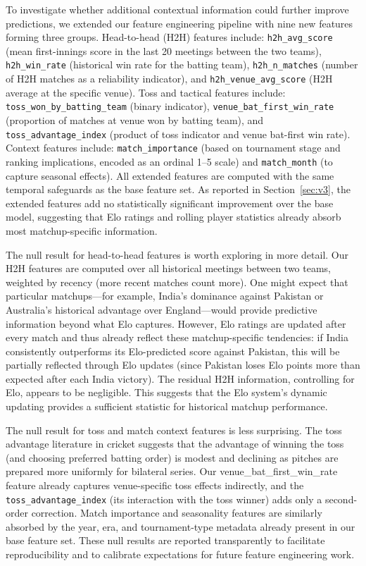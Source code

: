 \documentclass[10pt,a4paper,twocolumn]{article}
\begin{document}
To investigate whether additional contextual information could further improve predictions, we extended our feature engineering pipeline with nine new features forming three groups. Head-to-head (H2H) features include: \texttt{h2h\_avg\_score} (mean first-innings score in the last 20 meetings between the two teams), \texttt{h2h\_win\_rate} (historical win rate for the batting team), \texttt{h2h\_n\_matches} (number of H2H matches as a reliability indicator), and \texttt{h2h\_venue\_avg\_score} (H2H average at the specific venue). Toss and tactical features include: \texttt{toss\_won\_by\_batting\_team} (binary indicator), \texttt{venue\_bat\_first\_win\_rate} (proportion of matches at venue won by batting team), and \texttt{toss\_advantage\_index} (product of toss indicator and venue bat-first win rate). Context features include: \texttt{match\_importance} (based on tournament stage and ranking implications, encoded as an ordinal 1--5 scale) and \texttt{match\_month} (to capture seasonal effects). All extended features are computed with the same temporal safeguards as the base feature set. As reported in Section~\ref{sec:v3}, the extended features add no statistically significant improvement over the base model, suggesting that Elo ratings and rolling player statistics already absorb most matchup-specific information.

The null result for head-to-head features is worth exploring in more detail. Our H2H features are computed over all historical meetings between two teams, weighted by recency (more recent matches count more). One might expect that particular matchups---for example, India's dominance against Pakistan or Australia's historical advantage over England---would provide predictive information beyond what Elo captures. However, Elo ratings are updated after every match and thus already reflect these matchup-specific tendencies: if India consistently outperforms its Elo-predicted score against Pakistan, this will be partially reflected through Elo updates (since Pakistan loses Elo points more than expected after each India victory). The residual H2H information, controlling for Elo, appears to be negligible. This suggests that the Elo system's dynamic updating provides a sufficient statistic for historical matchup performance.

The null result for toss and match context features is less surprising. The toss advantage literature in cricket suggests that the advantage of winning the toss (and choosing preferred batting order) is modest and declining as pitches are prepared more uniformly for bilateral series. Our venue\_bat\_first\_win\_rate feature already captures venue-specific toss effects indirectly, and the \texttt{toss\_advantage\_index} (its interaction with the toss winner) adds only a second-order correction. Match importance and seasonality features are similarly absorbed by the year, era, and tournament-type metadata already present in our base feature set. These null results are reported transparently to facilitate reproducibility and to calibrate expectations for future feature engineering work.
\end{document}
